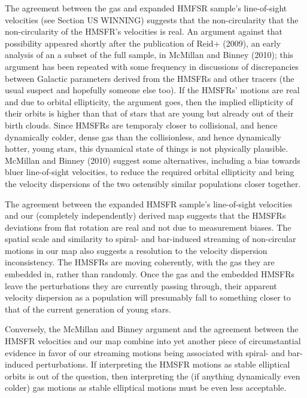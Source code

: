 The agreement between the gas and expanded HMFSR sample's line-of-sight velocities (see Section US WINNING) suggests that the non-circularity that the non-circularity of the HMSFR's velocities is real. 
An argument against that possibility appeared shortly after the publication of Reid+ (2009), an early analysis of an a subset of the full \Reid sample, in McMillan and Binney (2010); this argument has been repeated with some frequency in discussions of discrepancies between Galactic parameters derived from the HMSFRs and other tracers (the usual suspect and hopefully someone else too).
If the HMSFRs' motions are real and due to orbital ellipticity, the argument goes, then the implied ellipticity of their orbits is higher than that of stars that are young but already out of their birth clouds. 
Since HMSFRs are temporaly closer to collisional, and hence dynamically colder, dense gas than the collisionless, and hence dynamically hotter, young stars, this dynamical state of things is not physically plausible. 
McMillan and Binney (2010) suggest some alternatives, including a bias towards bluer line-of-sight velocities, to reduce the required orbital ellipticity and bring the velocity dispersions of the two ostensibly similar populations closer together.

The agreement between the expanded HMSFR sample's line-of-sight velocities and our (completely independently) derived map suggests that the HMSFRs deviations from flat rotation are real and not due to measurement biases.
The spatial scale and similarity to spiral- and bar-induced streaming of non-circular motions in our map also suggests a resolution to the velocity dispersion inconsistency. The HMSFRs are moving coherently, with the gas they are embedded in, rather than randomly. Once the gas and the embedded HMSFRs leave the perturbations they are currently passing through, their apparent velocity dispersion as a population will presumably fall to something closer to that of the current generation of young stars.

Conversely, the McMillan and Binney argument and the agreement between the HMSFR velocities and our map combine into yet another piece of circumstantial evidence in favor of our streaming motions being associated with spiral- and bar-induced perturbations. 
If interpreting the HMSFR motions as stable elliptical orbits is out of the question, then interpreting the (if anything dynamically even colder) gas motions as stable elliptical motions must be even less acceptable.
